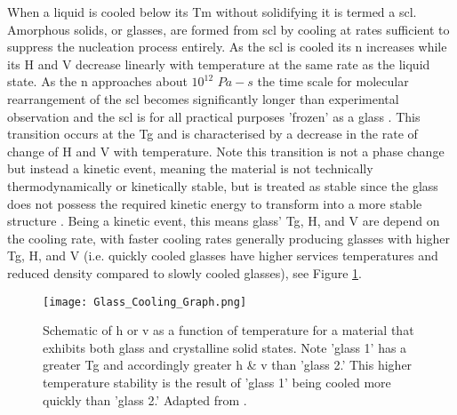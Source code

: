 \documentclass[a4paper,12pt,oneside]{report}%
\begin{document}
When a liquid is cooled below its \gls{Tm} without solidifying it is termed a \gls{scl}. Amorphous solids, or glasses, are formed from \gls{scl} by cooling at rates sufficient to suppress the nucleation process entirely. As the \gls{scl} is cooled its \gls{n} increases while its \gls{H} and \gls{V} decrease linearly with temperature at the same rate as the liquid state. As the \gls{n} approaches about $10^{12}$ $Pa-s$ the time scale for molecular rearrangement of the \gls{scl} becomes significantly longer than experimental observation and the \gls{scl} is for all practical purposes 'frozen' as a glass \cite{Ediger1996, Ishii2014}. This transition occurs at the \gls{Tg} and is characterised by a decrease in the rate of change of \gls{H} and \gls{V} with temperature. Note this transition is not a phase change but instead a kinetic event, meaning the material is not technically thermodynamically or kinetically stable, but is treated as stable since the glass does not possess the required kinetic energy to transform into a more stable structure \cite{Ediger1996, Ishii2014}. Being a kinetic event, this means glass' \gls{Tg}, \gls{H}, and \gls{V} are depend on the cooling rate, with faster cooling rates generally producing glasses with higher \gls{Tg}, \gls{H}, and \gls{V} (i.e. quickly cooled glasses have higher services temperatures and reduced density compared to slowly cooled glasses), see Figure \ref{fig:GlassCooling}. 

\begin{figure}[htbp]
	\centering
	\texttt{[image: Glass\_Cooling\_Graph.png]}
	\caption[Schematic of \gls{h} or \gls{v} as a function of temperature for a material that exhibits both glass and crystalline solid states. Note 'glass 1' has a greater \acrshort{Tg} and accordingly greater \gls{h} \& \gls{v} than 'glass 2.' This higher temperature stability is the result of 'glass 1' being cooled more quickly than 'glass 2.']{Schematic of \gls{h} or \gls{v} as a function of temperature for a material that exhibits both glass and crystalline solid states. Note 'glass 1' has a greater \acrshort{Tg} and accordingly greater \gls{h} \& \gls{v} than 'glass 2.' This higher temperature stability is the result of 'glass 1' being cooled more quickly than 'glass 2.' Adapted from \cite{Ediger1996}.}
	\label{fig:GlassCooling}
\end{figure}
\end{document}
